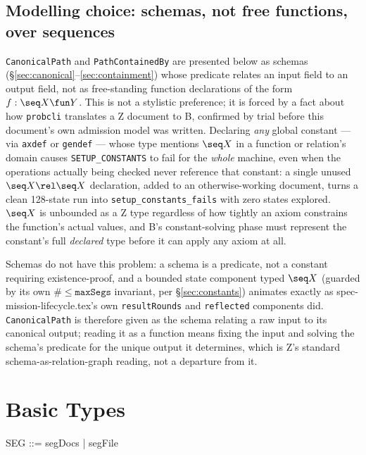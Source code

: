 \documentclass[a4paper,10pt,fleqn]{article}
\newcommand{\field}[1]{\texttt{#1}}
\begin{document}
\subsection{Modelling choice: schemas, not free functions, over
sequences}
\label{sec:modellingchoice}

\field{CanonicalPath} and \field{PathContainedBy} are presented below
as schemas (\S\ref{sec:canonical}--\ref{sec:containment}) whose
predicate relates an input field to an output field, not as
free-standing \fuzz{} function declarations of the form
$f : \seq X \fun Y$. This is not a stylistic preference; it is
forced by a fact about how \texttt{probcli} translates a Z document
to B, confirmed by trial before this document's own admission model
was written. Declaring \emph{any} global constant --- via
\field{axdef} or \field{gendef} --- whose type mentions $\seq X$ in a
function or relation's domain causes \texttt{SETUP\_CONSTANTS} to
fail for the \emph{whole} machine, even when the operations actually
being checked never reference that constant: a single unused
$\seq X \rel \seq X$ declaration, added to an otherwise-working
document, turns a clean 128-state run into
\texttt{setup\_constants\_fails} with zero states explored. $\seq X$
is unbounded as a Z type regardless of how tightly an axiom
constrains the function's actual values, and B's constant-solving
phase must represent the constant's full \emph{declared} type before
it can apply any axiom at all.

Schemas do not have this problem: a schema is a predicate, not a
constant requiring existence-proof, and a bounded state component
typed $\seq X$ (guarded by its own $\# \leq \field{maxSegs}$
invariant, per \S\ref{sec:constants}) animates exactly as
spec-mission-lifecycle.tex's own \field{resultRounds} and
\field{reflected} components did. \field{CanonicalPath} is therefore
given as the schema relating a raw input to its canonical output;
reading it as a function means fixing the input and solving the
schema's predicate for the unique output it determines, which is
Z's standard schema-as-relation-graph reading, not a departure from
it.

\section{Basic Types}
\label{sec:basic}

\begin{zed}
SEG ::= segDocs | segFile
\end{zed}
\end{document}
